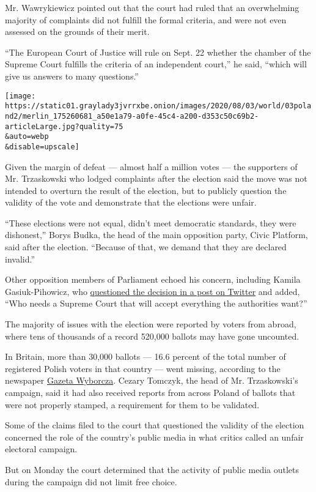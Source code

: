 Mr. Wawrykiewicz pointed out that the court had ruled that an
overwhelming majority of complaints did not fulfill the formal criteria,
and were not even assessed on the grounds of their merit.

``The European Court of Justice will rule on Sept. 22 whether the
chamber of the Supreme Court fulfills the criteria of an independent
court,'' he said, ``which will give us answers to many questions.''

\texttt{[image: https://static01.graylady3jvrrxbe.onion/images/2020/08/03/world/03poland2/merlin\_175260681\_a50e1a79-a0fe-45c4-a200-d353c50c69b2-articleLarge.jpg?quality=75\\\&auto=webp\\\&disable=upscale]}

Given the margin of defeat --- almost half a million votes --- the
supporters of Mr. Trzaskowski who lodged complaints after the election
said the move was not intended to overturn the result of the election,
but to publicly question the validity of the vote and demonstrate that
the elections were unfair.

``These elections were not equal, didn't meet democratic standards, they
were dishonest,'' Borys Budka, the head of the main opposition party,
Civic Platform, said after the election. ``Because of that, we demand
that they are declared invalid.''

Other opposition members of Parliament echoed his concern, including
Kamila Gasiuk-Pihowicz, who
\href{https://twitter.com/Gasiuk_Pihowicz/status/1290250927165673473}{questioned
the decision in a post on Twitter} and added, ``Who needs a Supreme
Court that will accept everything the authorities want?''

The majority of issues with the election were reported by voters from
abroad, where tens of thousands of a record 520,000 ballots may have
gone uncounted.

In Britain, more than 30,000 ballots --- 16.6 percent of the total
number of registered Polish voters in that country --- went missing,
according to the newspaper \href{https://wyborcza.pl/0,0.html}{Gazeta
Wyborcza}. Cezary Tomczyk, the head of Mr. Trzaskowski's campaign, said
it had also received reports from across Poland of ballots that were not
properly stamped, a requirement for them to be validated.

Some of the claims filed to the court that questioned the validity of
the election concerned the role of the country's public media in what
critics called an unfair electoral campaign.

But on Monday the court determined that the activity of public media
outlets during the campaign did not limit free choice.

